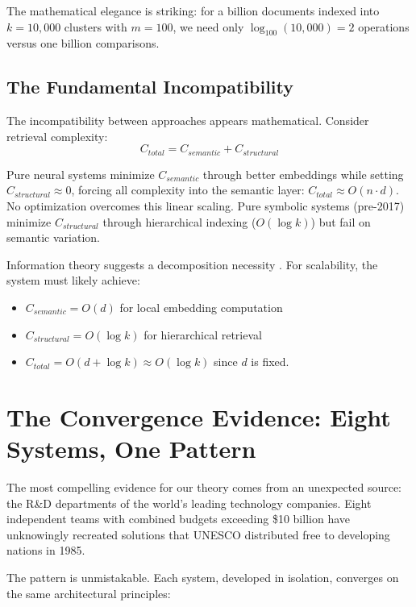 \documentclass[manuscript,screen,nonacm]{acmart}
\begin{document}
The mathematical elegance is striking: for a billion documents indexed into $k=10,000$ clusters with $m=100$, we need only $\log_{100}(10,000) = 2$ operations versus one billion comparisons.

\subsection{The Fundamental Incompatibility}
The incompatibility between approaches appears mathematical. Consider retrieval complexity:
\[ C_{total} = C_{semantic} + C_{structural} \]

Pure neural systems minimize $C_{semantic}$ through better embeddings while setting $C_{structural} \approx 0$, forcing all complexity into the semantic layer: $C_{total} \approx O(n \cdot d)$. No optimization overcomes this linear scaling. Pure symbolic systems (pre-2017) minimize $C_{structural}$ through hierarchical indexing ($O(\log k)$) but fail on semantic variation.

Information theory suggests a decomposition necessity \cite{chen2025}. For scalability, the system must likely achieve:
\begin{itemize}
    \item $C_{semantic} = O(d)$ for local embedding computation
    \item $C_{structural} = O(\log k)$ for hierarchical retrieval
    \item $C_{total} = O(d + \log k) \approx O(\log k)$ since $d$ is fixed.
\end{itemize}

\section{The Convergence Evidence: Eight Systems, One Pattern}

The most compelling evidence for our theory comes from an unexpected source: the R\&D departments of the world's leading technology companies. Eight independent teams with combined budgets exceeding \$10 billion have unknowingly recreated solutions that UNESCO distributed free to developing nations in 1985.

The pattern is unmistakable. Each system, developed in isolation, converges on the same architectural principles:
\end{document}
